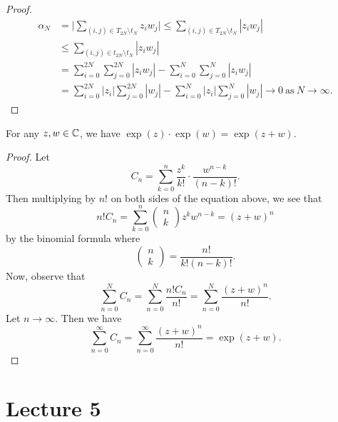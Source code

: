 \documentclass[a4paper]{report}
\begin{document}
\begin{proof}
\begin{align*}
    {\alpha}_{N} &= \Big|  \sum_{ (i,j) \in {T}_{2N} \setminus  {t}_{N} }^{  } {z}_{i} {w}_{j} \Big| \leq \sum_{ (i,j) \in {T}_{2N} \setminus {t}_{N} }^{  } | {z}_{i} {w}_{j} |  \\
                 &\leq \sum_{ (i,j) \in {t}_{2N} \setminus  {t}_{N} }^{  } | {z}_{i} {w}_{j} |  \\
                 &= \sum_{ i=0  }^{ 2N  } \sum_{ j = 0  }^{ 2N  } | {z}_{i} {w}_{j} |  - \sum_{ i = 0  }^{  N  } \sum_{ j = 0  }^{  N  } | {z}_{i} {w}_{j} |  \\
                 &= \sum_{ i = 0  }^{  2 N  } | {z}_{i} | \sum_{ j = 0  }^{  2N  } | {w}_{j} |  - \sum_{ i = 0  }^{  N  } | {z}_{i} |  \sum_{ j = 0  }^{  N  } | {w}_{j} | \to 0  \ \text{as} \ N \to \infty.
\end{align*}


\end{proof}

\begin{corollary}
   For any \( z,w \in \mathbb{C}  \), we have \( \exp(z) \cdot \exp(w) = \exp(z + w) \). 
\end{corollary}
\begin{proof}
Let
\[  {C}_{n} = \sum_{ k = 0  }^{ n  } \frac{ z^{k } }{  k!  }  \cdot \frac{ w^{n-k} }{ (n-k)! }. \]
Then multiplying by \( n!  \) on both sides of the equation above, we see that
\[  n! {C}_{n} = \sum_{ k = 0  }^{ n  } \begin{pmatrix} n \\ k  \end{pmatrix} z^{k } w^{n - k } = (z + w)^{n} \]
by the binomial formula where
\[  \begin{pmatrix} n \\ k  \end{pmatrix}  = \frac{ n!  }{ k! (n- k)! }. \]
Now, observe that
\[  \sum_{ n = 0  }^{  N  } {C}_{n} = \sum_{ n = 0  }^{  N  } \frac{ n! {C}_{n}  }{  n!  }  = \sum_{ n = 0  }^{  N  } \frac{ (z + w )^{n} }{ n!  }. \]
Let \( n \to \infty  \). Then we have
\[  \sum_{ n = 0  }^{  \infty  } {C}_{n} = \sum_{ n = 0  }^{  \infty  } \frac{ (z+w)^{n} }{ n!  }  = \exp(z+w). \]

\end{proof}


\section{Lecture 5}
\end{document}
